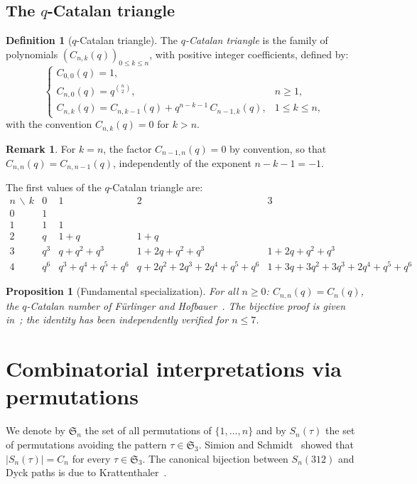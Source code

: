 \documentclass[12pt,a4paper,reqno]{amsart}
\theoremstyle{plain}
\newtheorem{proposition}[theorem]{Proposition}
\theoremstyle{definition}
\newtheorem{definition}[theorem]{Definition}
\newtheorem{remark}[theorem]{Remark}
\begin{document}
\subsection{The $q$-Catalan triangle}
\begin{definition}[$q$-Catalan triangle]\label{def:qcat}
The \emph{$q$-Catalan triangle} is the family of polynomials
$(C_{n,k}(q))_{0\le k\le n}$, with positive integer coefficients, defined by:
\begin{equation}\label{eq:rec_q}
\begin{cases}
C_{0,0}(q)=1,\\[4pt]
C_{n,0}(q) = q^{\binom{n}{2}}, & n\ge1,\\[4pt]
C_{n,k}(q) = C_{n,k-1}(q)+q^{n-k-1}\,C_{n-1,k}(q), & 1\le k\le n,
\end{cases}
\end{equation}
with the convention $C_{n,k}(q)=0$ for $k>n$.
\end{definition}
\begin{remark}\label{rem:kn}
For $k=n$, the factor $C_{n-1,n}(q)=0$ by convention,
so that $C_{n,n}(q)=C_{n,n-1}(q)$,
independently of the exponent $n-k-1=-1$.
\end{remark}
The first values of the $q$-Catalan triangle are:
\[\begin{array}{c|cccc}
n\,\backslash\, k & 0 & 1 & 2 & 3\\\hline
0 & 1 \\[2pt] 1 & 1 & 1 \\[2pt]
2 & q & 1{+}q & 1{+}q \\[2pt]
3 & q^3 & q{+}q^2{+}q^3 & 1{+}2q{+}q^2{+}q^3 & 1{+}2q{+}q^2{+}q^3\\[2pt]
4 & q^6 & q^3{+}q^4{+}q^5{+}q^6 & q{+}2q^2{+}2q^3{+}2q^4{+}q^5{+}q^6
  & 1{+}3q{+}3q^2{+}3q^3{+}2q^4{+}q^5{+}q^6
\end{array}\]
\begin{proposition}[Fundamental specialization]\label{prop:spec}
For all $n\ge0$: $C_{n,n}(q) = C_n(q)$,
the $q$-Catalan number of F\"urlinger and Hofbauer~\cite{FH}.
The bijective proof is given in~\cite{W3};
the identity has been independently verified for $n\le 7$.
\end{proposition}

\section{Combinatorial interpretations via permutations}\label{sec:perm}
We denote by $\mathfrak{S}_n$ the set of all permutations
of $\{1,\ldots,n\}$ and by $S_n(\tau)$ the set of permutations
avoiding the pattern $\tau\in\mathfrak{S}_3$.
Simion and Schmidt~\cite{SS} showed that $|S_n(\tau)|=C_n$
for every $\tau\in\mathfrak{S}_3$.
The canonical bijection between $S_n(312)$ and Dyck paths
is due to Krattenthaler~\cite{Krattenthaler}.
\end{document}

